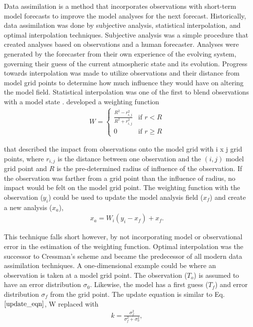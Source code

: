 \documentclass{ttuthes2007}
\newcommand{\tab}{\hspace*{2em}}  %
\begin{document}
\tab Data assimilation is a method that incorporates observations with short-term model forecasts to improve the model analyses for the next forecast. Historically, data assimilation was done by subjective analysis, statistical interpolation, and optimal interpolation techniques. Subjective analysis was a simple procedure that created analyses based on observations and a human forecaster. Analyses were generated by the forecaster from their own experience of the evolving system, governing their guess of the current atmospheric state and its evolution. Progress towards interpolation was made to utilize observations and their distance from model grid points to determine how much influence they would have on altering the model field. Statistical interpolation was one of the first to blend observations with a model state \citep{Cressman1959}. \citet{Cressman1959} developed a weighting function
\begin{align}\label{weight_func}
 W =
  \begin{cases}
  \frac{R^2 - r_{i,j}^2}{R^2 + r_{i,j}^2}  & \text{if } r < R \\
   0       & \text{if } r \geq R
  \end{cases}
\end{align}

that described the impact from observations onto the model grid with i x j grid points, where $r_{i,j}$ is the distance between one observation and the $(i,j)$ model grid point and $R$ is the pre-determined radius of influence of the observation. If the observation was farther from a grid point than the influence of radius, no impact would be felt on the model grid point. The weighting function with the observation ($y_i$) could be used to update the model analysis field ($x_f$) and create a new analysis ($x_a$),
\begin{align}\label{update_eqn}
	x_a = W_i ( y_i - x_f ) + x_f.
\end{align}

This technique falls short however, by not incorporating model or observational error in the estimation of the weighting function. Optimal interpolation was the successor to Cressman's scheme and became the predecessor of all modern data assimilation techniques. A one-dimensional example could be where an observation is taken at a model grid point. The observation ($T_o$) is assumed to have an error distribution $\sigma_0$. Likewise, the model has a first guess ($T_f$) and error distribution $\sigma_f$ from the grid point. The update equation is similar to Eq.~$\ref{update_eqn}$, W replaced with
\begin{align}\label{optimal_k}
	k = \frac{\sigma^2_f}{\sigma^2_f + \sigma^2_o},
\end{align}
\end{document}
